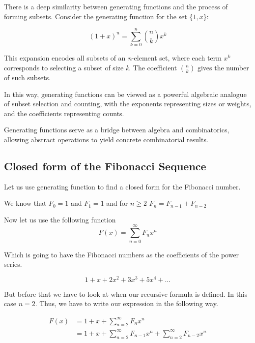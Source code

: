 There is a deep similarity between generating functions and the process of forming subsets. Consider the 
generating function for the set \( \{1, x\} \):

\[
    {(1 + x)}^n = \sum_{k=0}^n \binom{n}{k} x^k
\]

This expansion encodes all subsets of an \emph{n}-element set, where each term \( x^k \) corresponds to 
selecting a subset of size \emph{k}. The coefficient \( \binom{n}{k} \) gives the number of such subsets.
\vspace{\baselineskip}

In this way, generating functions can be viewed as a powerful algebraic analogue of subset selection and 
counting, with the exponents representing sizes or weights, and the coefficients representing counts.
\vspace{\baselineskip}

Generating functions serve as a bridge between algebra and combinatorics, allowing abstract operations to 
yield concrete combinatorial results.

\subsection{Closed form of the Fibonacci Sequence}

Let us use generating function to find a closed form for the Fibonacci number. 
\vspace{\baselineskip}

We know that \(F_0 = 1\) and \(F_1 = 1\) and for \(n \ge 2\) \(F_n = F_{n-1} + F_{n-2}\)
\vspace{\baselineskip}

Now let us use the following function
\[
    F(x) = \sum_{n = 0}^{\infty} F_n x^{n}
\]

Which is going to have the Fibonacci numbers as the coefficients of the power series.

\[
    1 + x + 2x^2 + 3x^3 + 5x^4 + \dots
\]

But before that we have to look at when our recursive formula is defined.
In this case \(n = 2\). Thus, we have to write our expression in the following way.

\begin{align*}
    F(x) &= 1 + x + \sum_{n = 2}^{\infty} F_n x^{n}\\
    &= 1 + x + \sum_{n = 2}^{\infty} F_{n -1} x^{n} + \sum_{n = 2}^{\infty} F_{n - 2}x^n 
\end{align*}

